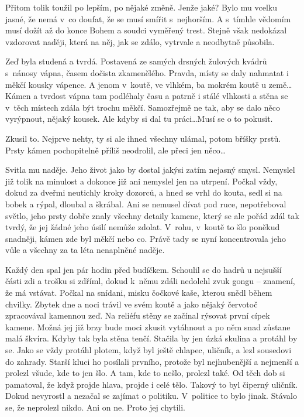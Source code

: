 Přitom tolik toužil po lepším, po nějaké změně. Jenže jaké? Bylo mu vcelku jasné, že nemá v co doufat, že se musí smířit s nejhorším. A s tímhle vědomím musí dožít až do konce Bohem a soudci vyměřený trest. Stejně však nedokázal vzdorovat naději, která na něj, jak se zdálo, vytrvale a neodbytně působila.

Zeď byla studená a tvrdá. Postavená ze samých drsných žulových kvádrů s nánosy vápna, časem dočista zkamenělého. Pravda, místy se daly nahmatat i měkčí kousky vápence. A jenom v koutě, ve vlhkém, ba mokrém koutě u země\ldots Kámen a tvrdost vápna tam podléhaly času a patrně i stálé vlhkosti a stěna se v těch místech zdála být trochu měkčí. Samozřejmě ne tak, aby se dalo něco vyrýpnout, nějaký kousek. Ale kdyby si dal tu práci\ldots Musí se o to pokusit.

Zkusil to. Nejprve nehty, ty si ale ihned všechny ulámal, potom bříšky prstů. Prsty kámen pochopitelně příliš neodrolil, ale přeci jen něco\ldots

Svitla mu naděje. Jeho život jako by dostal jakýsi zatím nejasný smysl. Nemyslel již tolik na minulost a dokonce již ani nemyslel jen na utrpení. Počkal vždy, dokud za dveřmi neutichly kroky dozorců, a hned se vrhl do kouta, sedl si na bobek a rýpal, dloubal a škrábal. Ani se nemusel dívat pod ruce, nepotřeboval světlo, jeho prsty dobře znaly všechny detaily kamene, který se ale pořád zdál tak tvrdý, že jej žádné jeho úsilí nemůže zdolat. V rohu, v koutě to šlo poněkud snadněji, kámen zde byl měkčí nebo co. Právě tady se nyní koncentrovala jeho vůle a všechny za ta léta nenaplněné naděje.

Každý den spal jen pár hodin před budíčkem. Schoulil se do hadrů u nejsušší části zdi a trošku si zdříml, dokud k němu zdáli nedolehl zvuk gongu -- znamení, že má vstávat. Počkal na snídani, misku čočkové kaše, kterou snědl během chvilky. Zbytek dne a noci trávil ve svém koutě a jako nějaký červotoč zpracovával kamennou zeď. Na reliéfu stěny se začínal rýsovat první cípek kamene. Možná jej již brzy bude moci zkusit vytáhnout a po něm snad zůstane malá škvíra. Kdyby tak byla stěna tenčí. Stačila by jen úzká skulina a protáhl by se. Jako se vždy protáhl plotem, když byl ještě chlapec, uličník, a lezl sousedovi do zahrady. Starší kluci ho posílali prvního, protože byl nejhubenější a nejmenší a prolezl všude, kde to jen šlo. A tam, kde to nešlo, prolezl také. Od těch dob si pamatoval, že když projde hlava, projde i celé tělo. Takový to byl čiperný uličník. Dokud nevyrostl a nezačal se zajímat o politiku. V politice to bylo jinak. Stávalo se, že neprolezl nikdo. Ani on ne. Proto jej chytili.

